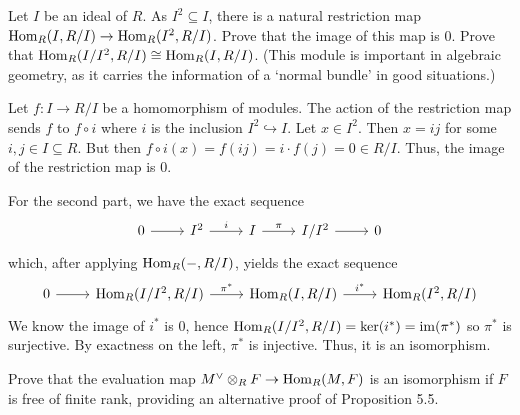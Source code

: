 \documentclass[../../master.tex]{subfiles}
\begin{document}
\begin{problem}
    Let $I$ be an ideal of $R$.
    As $I^2 \subseteq I$, there is a natural restriction map $\operatorname{Hom}_R(I, R/I) \to \operatorname{Hom}_R(I^2, R/I)$.
    Prove that the image of this map is 0.
    Prove that $\operatorname{Hom}_R(I/I^2, R/I) \cong \operatorname{Hom}_R(I, R/I)$.
    (This module is important in algebraic geometry, as it carries the information of a `normal bundle' in good situations.)
\end{problem}

\begin{solution}
    Let $f : I \to R / I$ be a homomorphism of modules.
    The action of the restriction map sends $f$ to $f \circ i$ where $i$ is the inclusion $I^2 \hookrightarrow I$.
    Let $x \in I^2$.
    Then $x = ij$ for some $i, j \in I \subseteq R$.
    But then $f \circ i(x) = f(ij) = i \cdot f(j) = 0 \in R/I$.
    Thus, the image of the restriction map is 0.

    For the second part, we have the exact sequence
    \[
        \begin{tikzcd}
            0 & I^2 & I & I/I^2 & 0
            \arrow[from=1-1, to=1-2]
            \arrow[from=1-2, to=1-3, "i"]
            \arrow[from=1-3, to=1-4, "\pi"]
            \arrow[from=1-4, to=1-5] 
        \end{tikzcd}
    \]
    which, after applying $\operatorname{Hom}_R(-, R/I)$, yields the exact sequence
    \[
    \begin{tikzcd}
        0 & \Hom_R(I/I^2, R/I) & \Hom_R(I, R/I) & \Hom_R(I^2, R/I)
        \arrow[from=1-1, to=1-2]
        \arrow[from=1-2, to=1-3, "\pi^{*}"]
        \arrow[from=1-3, to=1-4, "i^{*}"] 
    \end{tikzcd}
    \]
    We know the image of $i^{*}$ is 0, hence $\operatorname{Hom}_R(I/I^2, R/I) = \ker(i^{*}) = \operatorname{im}(\pi^{*})$ so $\pi^{*}$ is surjective.
    By exactness on the left, $\pi^{*}$ is injective.
    Thus, it is an isomorphism.
\end{solution}

\begin{problem}
    Prove that the evaluation map $M^{\vee} \otimes_R F \to \operatorname{Hom}_R(M, F)$ is an isomorphism if $F$ is free of finite rank, providing an alternative proof of Proposition 5.5.
\end{problem}
\end{document}
